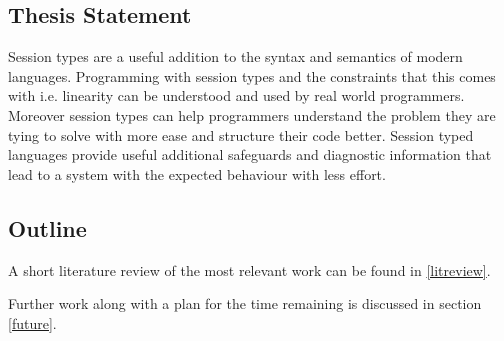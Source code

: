 \subsection{Thesis Statement}
Session types are a useful addition to the syntax and semantics of modern languages. Programming with session types and the constraints that this comes with i.e. linearity can be understood and used by real world programmers. Moreover session types can help programmers understand the problem they are tying to solve with more ease and structure their code better.
Session typed languages provide useful additional safeguards and diagnostic information that lead to a system with the expected behaviour with less effort.


\subsection{Outline}

 A short literature review of the most relevant work can be found in \ref{litreview}.


Further work along with a plan for the time remaining is discussed in section \ref{future}.
